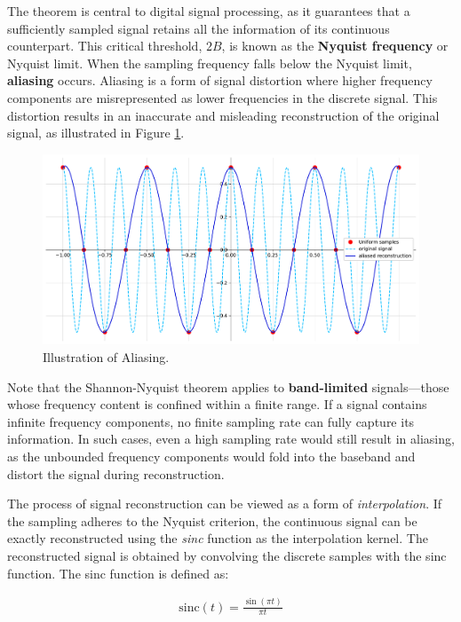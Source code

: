 The theorem is central to digital signal processing, as it guarantees that a sufficiently sampled signal retains all the information of its continuous counterpart. This critical threshold, \( 2B \), is known as the \textbf{Nyquist frequency} or Nyquist limit. When the sampling frequency falls below the Nyquist limit, \textbf{aliasing} occurs. Aliasing is a form of signal distortion where higher frequency components are misrepresented as lower frequencies in the discrete signal. This distortion results in an inaccurate and misleading reconstruction of the original signal, as illustrated in Figure \ref{f:aliasing-example}.

\begin{figure}[!h]
  \centering
  \includegraphics[width=0.85\linewidth]{img/ch2/aliasing-signal.pdf}
  \caption{Illustration of Aliasing.}
  \label{f:aliasing-example}
\end{figure}

Note that the Shannon-Nyquist theorem applies to \textbf{band-limited} signals—those whose frequency content is confined within a finite range. If a signal contains infinite frequency components, no finite sampling rate can fully capture its information. In such cases, even a high sampling rate would still result in aliasing, as the unbounded frequency components would fold into the baseband and distort the signal during reconstruction.

The process of signal reconstruction can be viewed as a form of \textit{interpolation}. If the sampling adheres to the Nyquist criterion, the continuous signal can be exactly reconstructed using the \textit{sinc} function as the interpolation kernel. The reconstructed signal is obtained by convolving the discrete samples with the sinc function. The sinc function is defined as:

\begin{align}
  \text{sinc}(t) = \frac{\sin(\pi t)}{\pi t}
\end{align}

